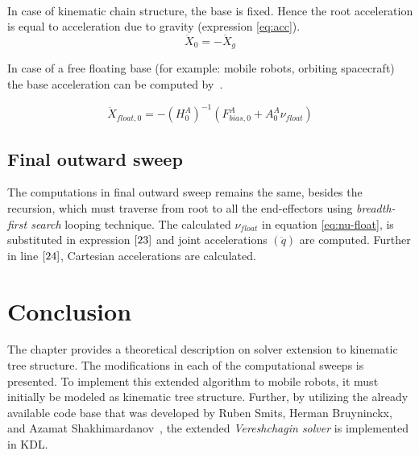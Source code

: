 \paragraph{}In case of kinematic chain structure, the base is fixed. Hence the root acceleration is equal to acceleration due to gravity (expression \ref{eq:acc}). 
\begin{equation}
	\label{eq:acc}
	\ddot{X}_0 = -\ddot{X}_g
\end{equation}

In case of a free floating base (for example: mobile robots, orbiting spacecraft) the base acceleration can be computed by~\cite{vereshchagin1989modeling}. 

\begin{equation}\label{eq:cartesian-acceleration}
\ddot{X}_{float, 0} = -(H_0^A)^{-1} (F_{bias, 0}^A + A_0^A  \nu_{float})
\end{equation}


\subsection{Final outward sweep}
The computations in final outward sweep remains the same, besides the recursion, which must traverse from root to all the end-effectors using \textit{breadth-first search} looping technique. The calculated $\nu_{float}$ in equation \ref{eq:nu-float}, is substituted in expression $\ref{23}$ and joint accelerations $(\ddot{q})$ are computed. Further in line $\ref{24}$, Cartesian accelerations are calculated.

\section{Conclusion}
The chapter provides a theoretical description on solver extension to kinematic tree structure. The modifications in each of the computational sweeps is presented. To implement this extended algorithm to mobile robots, it must initially be modeled as kinematic tree structure. Further, by utilizing the already available code base that was developed by Ruben Smits, Herman Bruyninckx, and Azamat Shakhimardanov~\cite{KDLopensource}, the extended \textit{Vereshchagin solver} is implemented in KDL.
  


%
%
%
%
